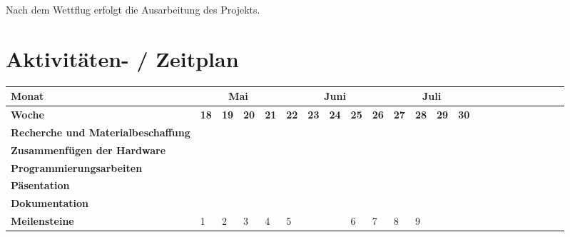 \documentclass[lang=ngerman,inputenc=utf8,fontsize=10pt]{ldvarticle}
\begin{document}
Nach dem Wettflug erfolgt die Ausarbeitung des Projekts.


\section{Aktivitäten- / Zeitplan}

\begin{center}
\begin{footnotesize}
\setlength{\arrayrulewidth}{1,05pt}
\begin{tabular}[htb]{|m{}|p{.05cm}|p{.05cm}|p{.05cm}|p{.05cm}|p{.05cm}|p{.05cm}|p{.05cm}|p{.05cm}|p{.05cm}|p{.05cm}|p{.05cm}|p{.05cm}|p{.05cm}|p{.05cm}|p{.05cm}|p{.05cm}|p{.05cm}|p{.05cm}|p{.05cm}|p{.05cm}|p{.05cm}|p{.05cm}|}
\hline
\textbf{Monat}& \multicolumn{4}{|c|}{Mai} & \multicolumn{5}{|c|}{Juni} & \multicolumn{4}{|c|}{Juli} \\
\hline
\textbf{Woche}&\tiny\textbf{18}&\tiny\textbf{19}&\tiny\textbf{20}&\tiny\textbf{21}& \tiny \textbf{22} & \tiny \textbf{23} & \tiny \textbf{24} & \tiny \textbf{25} & \tiny \textbf{26} & \tiny \textbf{27} & \tiny \textbf{28} & \tiny \textbf{29} & \tiny \textbf{30}\\
\hline
\hline
\rowcolor{lightgray} \textbf{Recherche und Materialbeschaffung}& \cellcolor{red} &\cellcolor{red} & & & & & & & & & & & \\
\hline
\rowcolor{lightgray} \textbf{Zusammenfügen der Hardware}& &\cellcolor{red} &\cellcolor{red} &\cellcolor{red} & & & & & & & & & \\
\hline
\rowcolor{lightgray} \textbf{Programmierungsarbeiten}& & &\cellcolor{red} &\cellcolor{red} &\cellcolor{red} &\cellcolor{red} &\cellcolor{red} &\cellcolor{red} &\cellcolor{red} &\cellcolor{red} & & & \\
\hline
\rowcolor{lightgray} \textbf{Päsentation}&\cellcolor{red} & & & &\cellcolor{red} & & & & & & & &\\
\hline
\rowcolor{lightgray} \textbf{Dokumentation}&\cellcolor{red} &\cellcolor{red} &\cellcolor{red} &\cellcolor{red} &\cellcolor{red} &\cellcolor{red} & \cellcolor{red} & \cellcolor{red} & \cellcolor{red} &\cellcolor{red} &\cellcolor{red} &\cellcolor{red} &\cellcolor{red}\\
\hline
\rowcolor{lightgray} \textbf{Meilensteine}&1 &2 &3 &4 &5 & & &6 &7 &8&9 & & \\
\hline

\end{tabular}
\end{footnotesize}
\end{center}
\end{document}
